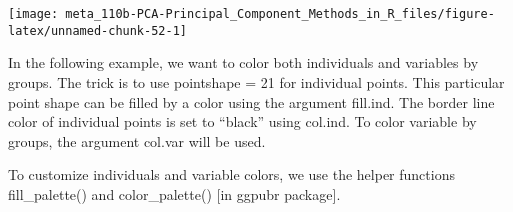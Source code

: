 \documentclass[]{book}
\newenvironment{Shaded}{\begin{snugshade}}{\end{snugshade}}
\newcommand{\CommentTok}[1]{\textcolor[rgb]{0.56,0.35,0.01}{\textit{#1}}}
\newcommand{\DataTypeTok}[1]{\textcolor[rgb]{0.13,0.29,0.53}{#1}}
\newcommand{\DecValTok}[1]{\textcolor[rgb]{0.00,0.00,0.81}{#1}}
\newcommand{\FloatTok}[1]{\textcolor[rgb]{0.00,0.00,0.81}{#1}}
\newcommand{\KeywordTok}[1]{\textcolor[rgb]{0.13,0.29,0.53}{\textbf{#1}}}
\newcommand{\NormalTok}[1]{#1}
\newcommand{\OperatorTok}[1]{\textcolor[rgb]{0.81,0.36,0.00}{\textbf{#1}}}
\newcommand{\OtherTok}[1]{\textcolor[rgb]{0.56,0.35,0.01}{#1}}
\newcommand{\StringTok}[1]{\textcolor[rgb]{0.31,0.60,0.02}{#1}}
\begin{document}
\begin{center}\texttt{[image: meta\_110b-PCA-Principal\_Component\_Methods\_in\_R\_files/figure-latex/unnamed-chunk-52-1]} \end{center}

In the following example, we want to color both individuals and variables by groups. The trick is to use pointshape = 21 for individual points. This particular point shape can be filled by a color using the argument fill.ind. The border line color of individual points is set to ``black'' using col.ind. To color variable by groups, the argument col.var will be used.

To customize individuals and variable colors, we use the helper functions fill\_palette() and color\_palette() {[}in ggpubr package{]}.

\begin{Shaded}
\end{Shaded}
\end{document}
